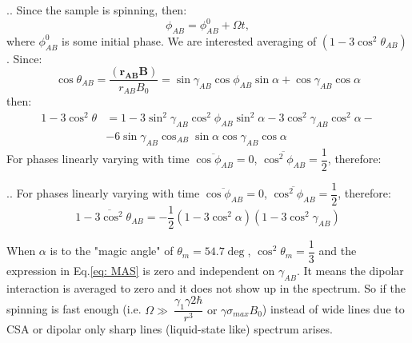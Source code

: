 \documentclass[handout]{beamer}
\begin{document}
\begin{frame}{\thesection.\thesubsection. \insertsubsection}
	 Since the sample is spinning, then:
	 \begin{equation}
	 \phi_{AB} = \phi_{AB}^0 + \Omega t,
	 \end{equation}
	 where $\phi_{AB}^0$ is some initial phase.
   We are interested averaging of $(1 - 3 \cos^2 \theta_{AB})$. Since:
   \begin{equation}
      \cos \theta_{AB} = \dfrac{(\bm{r_{AB}}  \bm{B})}{r_{AB} B_0} = \sin \gamma_{AB} \cos \phi_{AB} \sin \alpha + \cos \gamma_{AB} \cos \alpha
   \end{equation}
    then:
   \begin{align}
     1 - 3 \cos^2 \theta &= 1 - 3 \sin^2 \gamma_{AB} \cos^2 \phi_{AB} \sin^2 \alpha -3 \cos^2 \gamma_{AB} \cos^2 \alpha - \\
     &- 6 \sin \gamma_{AB} \cos_{AB} \sin \alpha \cos \gamma_{AB} \cos \alpha
   \end{align}
   For phases linearly varying with time $\overline{\cos \phi_{AB}} = 0 $,  $\overline{\cos^2 \phi_{AB}} = \dfrac{1}{2} $, therefore:
  

   
\end{frame}

\begin{frame}{\thesection.\thesubsection. \insertsubsection}
	 For phases linearly varying with time $\overline{\cos \phi_{AB}} = 0 $,  $\overline{\cos^2 \phi_{AB}} = \dfrac{1}{2} $, therefore:
	 \begin{equation} \label{eq: MAS}
	 \overline{1-3 \cos^2 \theta_{AB}} = -\dfrac{1}{2}(1 - 3 \cos^2 \alpha)(1 - 3 \cos^2 \gamma_{AB})
	 \end{equation}
	
	 When $\alpha$ is to the "magic angle" of $\theta_m =54.7 \deg$, $\cos^2 \theta_m = \dfrac{1}{3}$ and the expression in Eq.\ref{eq: MAS} is zero and independent on $\gamma_{AB}$. It means the dipolar interaction is averaged to zero and it does not show up in the spectrum. 
	 So if the spinning is fast enough (i.e. $\Omega \gg \ \dfrac{\gamma_1 \gamma2 \hbar}{r^3} \text{ or } \gamma \sigma_{max} B_0$) instead of wide lines due to CSA or dipolar only sharp lines (liquid-state like) spectrum arises. 
\end{frame}
\end{document}

